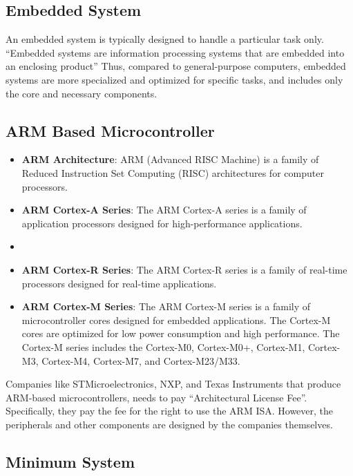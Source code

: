 \documentclass[a4paper,12pt]{article}
\begin{document}
\subsection{Embedded System}

An embedded system is typically designed to handle a particular task only. ``Embedded systems are information processing systems that are embedded into an enclosing product'' Thus, compared to general-purpose computers, embedded systems are more specialized and optimized for specific tasks, and includes only the core and necessary components.

\subsection{ARM Based Microcontroller}

\begin{itemize}
	\item \textbf{ARM Architecture}: ARM (Advanced RISC Machine) is a family of Reduced Instruction Set Computing (RISC) architectures for computer processors. 
	
	\item \textbf{ARM Cortex-A Series}: The ARM Cortex-A series is a family of application processors designed for high-performance applications.
	\item 
	\item \textbf{ARM Cortex-R Series}: The ARM Cortex-R series is a family of real-time processors designed for real-time applications.
	
	\item \textbf{ARM Cortex-M Series}: The ARM Cortex-M series is a family of microcontroller cores designed for embedded applications. The Cortex-M cores are optimized for low power consumption and high performance. The Cortex-M series includes the Cortex-M0, Cortex-M0+, Cortex-M1, Cortex-M3, Cortex-M4, Cortex-M7, and Cortex-M23/M33.
\end{itemize}

Companies like STMicroelectronics, NXP, and Texas Instruments that produce ARM-based microcontrollers, needs to pay ``Architectural License Fee''. Specifically, they pay the fee for the right to use the ARM ISA. However, the peripherals and other components are designed by the companies themselves.

\subsection{Minimum System}
\end{document}
